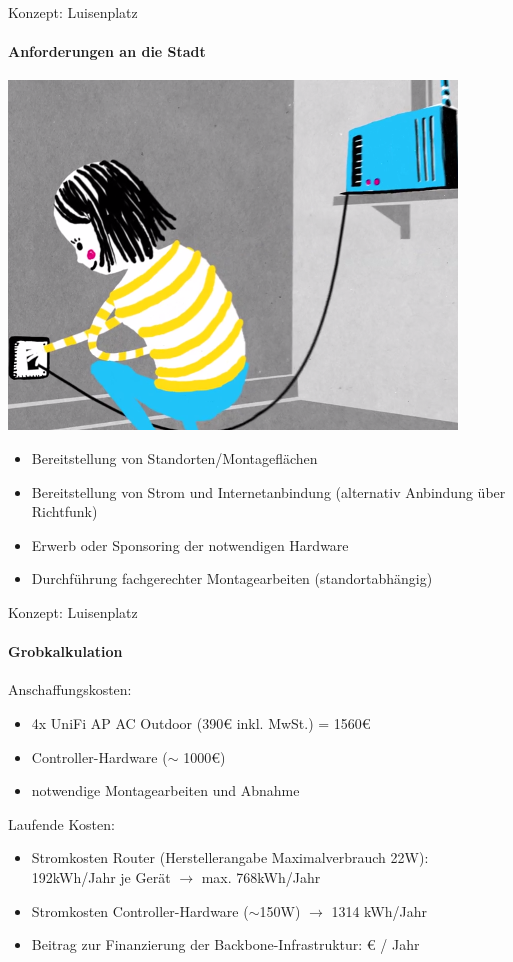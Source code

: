 \documentclass[]{beamer}
\begin{document}
\begin{frame}{Konzept: Luisenplatz}
\framesubtitle{Anforderungen an die Stadt}
\vfill
\begin{center}
\includegraphics[height=0.4\textheight]{../global/images/freifunk_setup}$\;$
\vfill
\end{center}
\begin{itemize}
\item Bereitstellung von Standorten/Montageflächen \pause
\item Bereitstellung von Strom und Internetanbindung (alternativ Anbindung über Richtfunk) \pause
\item Erwerb oder Sponsoring der notwendigen Hardware \pause
\item Durchführung fachgerechter Montagearbeiten (standortabhängig)
\end{itemize}
\vfill
\end{frame}

\begin{frame}{Konzept: Luisenplatz}
\framesubtitle{Grobkalkulation} \pause
Anschaffungskosten: \pause
\begin{itemize}
	\item 4x UniFi AP AC Outdoor (390\euro{} inkl. MwSt.) = 1560\euro{} \pause
	\item Controller-Hardware ($\sim$ 1000\euro{}) \pause
	\item notwendige Montagearbeiten und Abnahme \pause
\end{itemize}
\vfill \pause
Laufende Kosten: \pause
\begin{itemize}
	\item Stromkosten Router (Herstellerangabe Maximalverbrauch 22W):\newline
	192kWh/Jahr je Gerät $\rightarrow$ max. 768kWh/Jahr \pause
	\item Stromkosten Controller-Hardware \newline
	($\sim$150W) $\rightarrow$ 1314 kWh/Jahr \pause
	\item Beitrag zur Finanzierung der Backbone-Infrastruktur:  \euro{} / Jahr
\end{itemize}
\end{frame}
\end{document}
